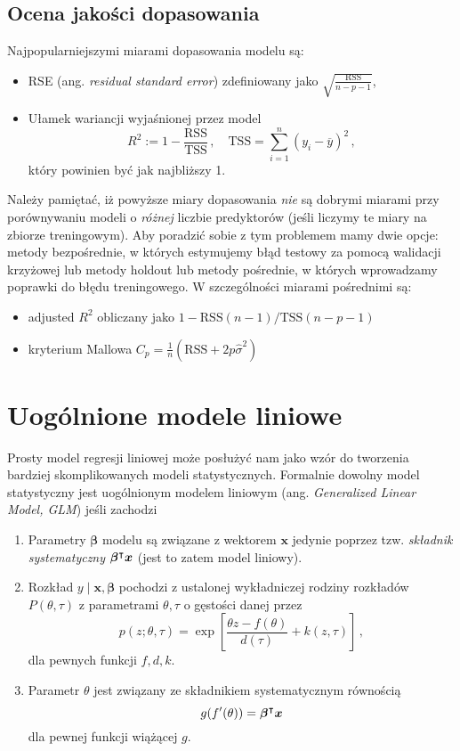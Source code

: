 \documentclass{myclass}
\begin{document}
\subsection{Ocena jakości dopasowania}

Najpopularniejszymi miarami dopasowania modelu są:
\begin{itemize}
    \item RSE (ang. \emph{residual standard error}) zdefiniowany jako $\sqrt{\frac{\text{RSS}}{n-p-1}}$,
    \item Ułamek wariancji wyjaśnionej przez model
    \[
        R^2 := 1 - \frac{\text{RSS}}{\text{TSS}}\,,\quad \text{TSS} = \sum_{i=1}^n (y_i - \overline{y})^2\,,
    \]
    który powinien być jak najbliższy 1.
\end{itemize}

Należy pamiętać, iż powyższe miary dopasowania \emph{nie} są dobrymi miarami przy porównywaniu
modeli o \emph{różnej} liczbie predyktorów (jeśli liczymy te miary na zbiorze treningowym). Aby
poradzić sobie z tym problemem mamy dwie opcje: metody bezpośrednie, w których estymujemy błąd
testowy za pomocą walidacji krzyżowej lub metody holdout lub metody pośrednie, w których wprowadzamy
poprawki do błędu treningowego. W szczególności miarami pośrednimi są:
\begin{itemize}
    \item adjusted $R^2$ obliczany jako $1 - \text{RSS}(n-1) / \text{TSS}(n-p-1)$
    \item kryterium Mallowa $C_p = \frac{1}{n}(\text{RSS} + 2 p \hat{\sigma}^2)$
\end{itemize}

\section{Uogólnione modele liniowe}

Prosty model regresji liniowej może posłużyć nam jako wzór do tworzenia bardziej skomplikowanych
modeli statystycznych. Formalnie dowolny model statystyczny jest uogólnionym modelem liniowym (ang.
\emph{Generalized Linear Model, GLM}) jeśli zachodzi
\begin{enumerate}
    \item Parametry $\bm{\beta}$ modelu są związane z wektorem $\bm{x}$ jedynie poprzez tzw.
    \emph{składnik systematyczny} $\bm{\beta}^\intercal \bm{x}$ (jest to zatem model liniowy).
    
    \item Rozkład $y \mid \bm{x}, \bm{\beta}$ pochodzi z ustalonej wykładniczej rodziny rozkładów
    $P(\theta, \tau)$ z parametrami $\theta, \tau$ o gęstości danej przez
    \[
        p(z; \theta, \tau) = \exp\left[\frac{\theta z - f(\theta)}{d(\tau)} + k(z, \tau)\right]\,,
    \]
    dla pewnych funkcji $f, d, k$.

    \item Parametr $\theta$ jest związany ze składnikiem systematycznym równością
    \[
        g(f'(\theta)) = \bm{\beta}^\intercal \bm{x}
    \]
    dla pewnej funkcji wiążącej $g$.
\end{enumerate}
\end{document}
